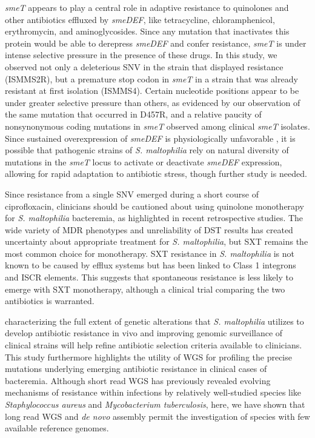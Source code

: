 \emph{smeT} appears to play a central role in adaptive resistance to quinolones and other antibiotics effluxed by \emph{smeDEF}, like tetracycline, chloramphenicol, erythromycin, and aminoglycosides. Since any mutation that inactivates this protein would be able to derepress \emph{smeDEF} and confer resistance, \emph{smeT} is under intense selective pressure in the presence of these drugs. In this study, we observed not only a deleterious SNV in the strain that displayed resistance (ISMMS2R), but a premature stop codon in \emph{smeT} in a strain that was already resistant at first isolation (ISMMS4). Certain nucleotide positions appear to be under greater selective pressure than others, as evidenced by our observation of the same mutation that occurred in D457R, and a relative paucity of nonsynonymous coding mutations in \emph{smeT} observed among clinical \emph{smeT} isolates.\autocite{Sanchez2004} Since sustained overexpression of \emph{smeDEF} is physiologically unfavorable \autocite{Alonso2004}, it is possible that pathogenic strains of \emph{S. maltophilia} rely on natural diversity of mutations in the \emph{smeT} locus to activate or deactivate \emph{smeDEF} expression, allowing for rapid adaptation to antibiotic stress, though further study is needed.

Since resistance from a single SNV emerged during a short course of ciprofloxacin, clinicians should be cautioned about using quinolone monotherapy for \emph{S. maltophilia} bacteremia, as highlighted in recent retrospective studies.\autocite{Cho2014a,Wang2014} The wide variety of MDR phenotypes and unreliability of DST results has created uncertainty about appropriate treatment for \emph{S. maltophilia}, but SXT remains the most common choice for monotherapy.\autocite{Brooke2012,Cho2014a,Wang2014} SXT resistance in \emph{S. maltophilia} is not known to be caused by efflux systems but has been linked to Class 1 integrons and ISCR elements.\autocite{Brooke2012} This suggests that spontaneous resistance is less likely to emerge with SXT monotherapy, although a clinical trial comparing the two antibiotics is warranted.\autocite{Cho2014a,Wang2014}

 characterizing the full extent of genetic alterations that \emph{S. maltophilia} utilizes to develop antibiotic resistance in vivo and improving genomic surveillance of clinical strains will help refine antibiotic selection criteria available to clinicians. This study furthermore highlights the utility of WGS for profiling the precise mutations underlying emerging antibiotic resistance in clinical cases of bacteremia. Although short read WGS has previously revealed evolving mechanisms of resistance within infections by relatively well-studied species like \emph{Staphylococcus aureus} and \emph{Mycobacterium tuberculosis},\autocite{Comas2011} here, we have shown that long read WGS and \emph{de novo} assembly permit the investigation of species with few available reference genomes.

